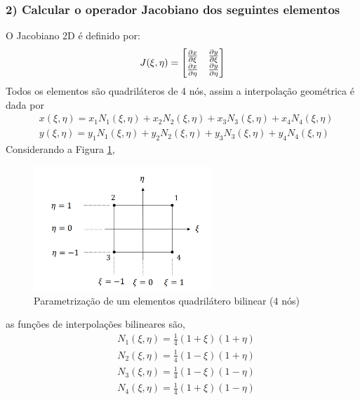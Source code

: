 \subsubsection{2) Calcular o operador Jacobiano dos seguintes elementos}

O Jacobiano 2D é definido por:
%
\begin{equation}
	J(\xi, \eta) = 
	\begin{bmatrix}
		\frac{\partial x}{\partial \xi} & \frac{\partial y}{\partial \xi}\\
		\frac{\partial x}{\partial \eta} & \frac{\partial y}{\partial \eta}\\
	\end{bmatrix}
\end{equation}
%
Todos os elementos são quadriláteros de 4 nós, assim a interpolação geométrica é dada por
%
\begin{equation}
	\begin{split}
		&x(\xi, \eta) = x_1 N_1(\xi, \eta) + x_2 N_2(\xi, \eta) + x_3 N_3(\xi, \eta) + x_4 N_4(\xi, \eta)\\
		&y(\xi, \eta) = y_1 N_1(\xi, \eta) + y_2 N_2(\xi, \eta) + y_3 N_3(\xi, \eta) + y_4 N_4(\xi, \eta)
	\end{split}
\end{equation}
%
Considerando a Figura \ref{cap6:quad_bilinear}, 
%
\begin{figure}[H]
	\includegraphics[width=0.6\textwidth,center]{fig/quadrilatero_4_livro.PNG}
	\caption{Parametrização de um elementos quadrilátero bilinear (4 nós)} 
	\label{cap6:quad_bilinear}
\end{figure}
%
as funções de interpolações bilineares são,
%
\begin{equation}
	\begin{split}
		&N_1(\xi, \eta) = \frac{1}{4}(1 + \xi)(1 + \eta)\\
		&N_2(\xi, \eta) = \frac{1}{4}(1 - \xi)(1 + \eta)\\
		&N_3(\xi, \eta) = \frac{1}{4}(1 - \xi)(1 - \eta)\\
		&N_4(\xi, \eta) = \frac{1}{4}(1 + \xi)(1 - \eta)
	\end{split}
\end{equation}
